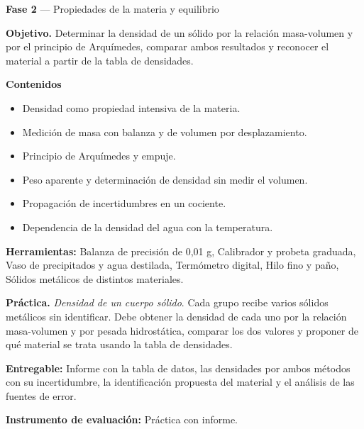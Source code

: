 \documentclass[11pt,a4paper]{article}
\begin{document}
\begin{tcolorbox}[cajaContenido,title={Semana 6 --- Densidad de un cuerpo sólido}]
\textbf{Fase 2} --- Propiedades de la materia y equilibrio

\textbf{Objetivo.} Determinar la densidad de un sólido por la relación masa-volumen y por el principio de Arquímedes, comparar ambos resultados y reconocer el material a partir de la tabla de densidades.

\textbf{Contenidos}

\begin{itemize}[leftmargin=1.4em,itemsep=2pt,topsep=3pt]
  \item Densidad como propiedad intensiva de la materia.
  \item Medición de masa con balanza y de volumen por desplazamiento.
  \item Principio de Arquímedes y empuje.
  \item Peso aparente y determinación de densidad sin medir el volumen.
  \item Propagación de incertidumbres en un cociente.
  \item Dependencia de la densidad del agua con la temperatura.
\end{itemize}

\textbf{Herramientas:} Balanza de precisión de 0,01 g, Calibrador y probeta graduada, Vaso de precipitados y agua destilada, Termómetro digital, Hilo fino y paño, Sólidos metálicos de distintos materiales.

\textbf{Práctica.} \emph{Densidad de un cuerpo sólido}. Cada grupo recibe varios sólidos metálicos sin identificar. Debe obtener la densidad de cada uno por la relación masa-volumen y por pesada hidrostática, comparar los dos valores y proponer de qué material se trata usando la tabla de densidades.

\textbf{Entregable:} Informe con la tabla de datos, las densidades por ambos métodos con su incertidumbre, la identificación propuesta del material y el análisis de las fuentes de error.

\textbf{Instrumento de evaluación:} Práctica con informe.
\end{tcolorbox}
\end{document}
